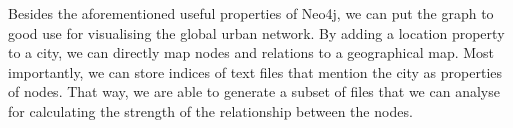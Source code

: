 Besides the aforementioned useful properties of Neo4j, we can put the graph to good use for visualising the global urban network. By adding a location property to a city, we can directly map nodes and relations to a geographical map. Most importantly, we can store indices of text files that mention the city as properties of nodes. That way, we are able to generate a subset of files that we can analyse for calculating the strength of the relationship between the nodes.

